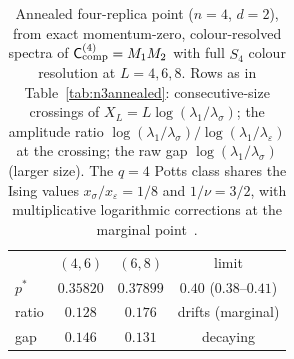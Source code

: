 \documentclass[aps,prx,reprint,superscriptaddress,nobibnotes,longbibliography]{revtex4-2}
\theoremstyle{remark}
\newcommand{\Ccomp}{\mathsf C_{\rm comp}}
\begin{document}
\begin{table}[t]
\caption{Annealed four-replica point ($n=4$, $d=2$), from exact momentum-zero, colour-resolved spectra of $\Ccomp^{(4)}=M_1M_2$ with full $S_4$ colour resolution at $L=4,6,8$.  Rows as in Table~\ref{tab:n3annealed}: consecutive-size crossings of $X_L=L\log(\lambda_1/\lambda_\sigma)$; the amplitude ratio $\log(\lambda_1/\lambda_\sigma)/\log(\lambda_1/\lambda_\varepsilon)$ at the crossing; the raw gap $\log(\lambda_1/\lambda_\sigma)$ (larger size).  The $q=4$ Potts class shares the Ising values $x_\sigma/x_\varepsilon=1/8$ and $1/\nu=3/2$, with multiplicative logarithmic corrections at the marginal point~\cite{Cardy1986}.}
\label{tab:n4annealed}
\begin{ruledtabular}
\begin{tabular}{lccc}
 & $(4,6)$ & $(6,8)$ & limit \\
\colrule
$p^*$ & $0.35820$ & $0.37899$ & $0.40$ ($0.38$--$0.41$) \\
ratio & $0.128$ & $0.176$ & drifts (marginal) \\
gap & $0.146$ & $0.131$ & decaying \\
\end{tabular}
\end{ruledtabular}
\end{table}
\end{document}
